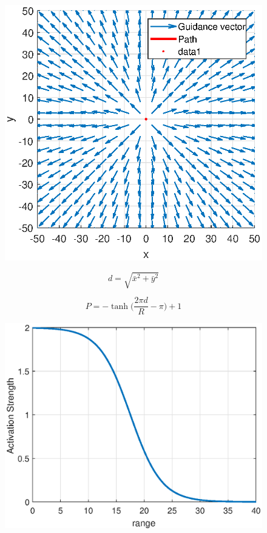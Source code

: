 \documentclass[conf]{new-aiaa}
\begin{document}
\begin{figure}[H]
	\centering
	\includegraphics[width=0.7\linewidth]{Figures/methods/normalizedRepulsive}
	\caption{}
	\label{fig:normalizedrepulsive}
\end{figure}





\begin{equation}
d = \sqrt{ \bar{x}^2+\bar{y}^2}
\end{equation}

\begin{equation}
P = -\tanh \bigg( \frac{2\pi d}{R}-\pi\bigg)+1
\end{equation}

\begin{figure}[H]
	\centering
	\includegraphics[width=0.7\linewidth]{Figures/methods/tanH}
	\caption{}
	\label{fig:tanh}
\end{figure}
\end{document}
